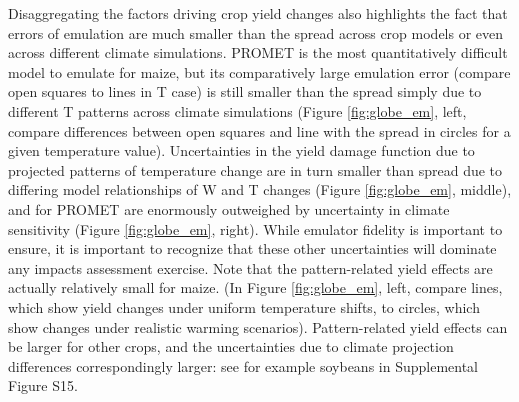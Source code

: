 \documentclass[gmdd]{copernicus} %
\begin{document}

Disaggregating the factors driving crop yield changes also highlights the fact that errors of emulation are much smaller than the spread across crop models or even across different climate simulations.
PROMET is the most quantitatively difficult model to emulate for maize, but its  %
comparatively large emulation error (compare open squares to lines in T case) is still smaller than the spread simply due to different T patterns across climate simulations (Figure \ref{fig:globe_em}, left, compare differences between open squares and line with the spread in circles for a given temperature value). Uncertainties in the yield damage function due to projected patterns of temperature change are in turn smaller than spread due to differing model relationships of W and T changes (Figure \ref{fig:globe_em}, middle), and for PROMET are enormously outweighed by uncertainty in climate sensitivity (Figure \ref{fig:globe_em}, right). %
While emulator fidelity is important to ensure, it is important to recognize that these other  uncertainties will dominate any impacts assessment exercise.
Note that the pattern-related yield effects are actually relatively small for maize. (In Figure \ref{fig:globe_em}, left, compare lines, which show yield changes under uniform temperature shifts, to circles,  which show changes under realistic warming scenarios). Pattern-related yield effects can be larger for other crops, and the uncertainties due to climate projection differences correspondingly larger: see for example soybeans in Supplemental Figure S15. 
\end{document}

